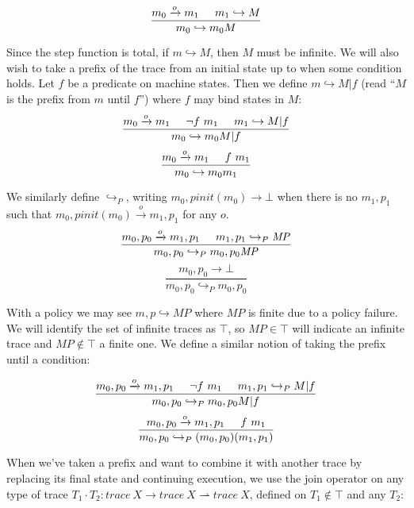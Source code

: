 \documentclass[conference]{IEEEtran}
\newcommand{\MP}{\mathit{MP}}
\begin{document}
    \[\frac{m_0 \xrightarrow{o} m_1 \hspace{.5cm} m_1 \hookrightarrow M}
           {m_0 \hookrightarrow m_0 M}\]

    Since the step function is total, if \(m \hookrightarrow M\), then \(M\) must be infinite.
    We will also wish to take a prefix of the trace from an initial state up to when some condition
    holds. Let \(f\) be a predicate on machine states. Then we define \(m \hookrightarrow M | f\)
    (read ``\(M\) is the prefix from \(m\) until \(f\)'') where \(f\) may bind states in \(M\):
    \[\frac{m_0 \xrightarrow{o} m_1 \hspace{.5cm} \neg f\ m_1 \hspace{.5cm} m_1 \hookrightarrow M | f }
           {m_0 \hookrightarrow m_0 M | f}\]
    \[\frac{m_0 \xrightarrow{o} m_1 \hspace{.5cm} f\ m_1}
           {m_0 \hookrightarrow m_0 m_1}\]

    We similarly define \(\hookrightarrow_P\), writing \(m_0,\mathit{pinit}(m_0) \longrightarrow \bot\) when
    there is no \(m_1,p_1\) such that \(m_0,\mathit{pinit}(m_0) \xrightarrow{o} m_1,p_1\) for any \(o\).
    \[\frac{m_0,p_0 \xrightarrow{o} m_1,p_1 \hspace{.5cm} m_1,p_1 \hookrightarrow_P \MP}
           {m_0,p_0 \hookrightarrow_P m_0,p_0 \MP}\]
    \[\frac{m_0,p_0 \longrightarrow \bot}
           {m_0,p_0 \hookrightarrow_P m_0,p_0}\]

    With a policy we may see \(m,p \hookrightarrow \MP\) where \(\MP\) is finite due to a policy
    failure. We will identify the set of infinite traces as \(\top\), so \(\MP \in \top\) will
    indicate an infinite trace and \(\MP \not \in \top\) a finite one.
    We define a similar notion of taking the prefix until a condition:

    \[\frac{m_0,p_0 \xrightarrow{o} m_1,p_1 \hspace{.5cm} \neg f\ m_1 \hspace{.5cm} m_1,p_1
              \hookrightarrow_P M | f }
           {m_0,p_0 \hookrightarrow_P m_0,p_0 M | f}\]
    \[\frac{m_0,p_0 \xrightarrow{o} m_1,p_1 \hspace{.5cm} f\ m_1}
           {m_0,p_0 \hookrightarrow_P (m_0,p_0) (m_1,p_1)}\]

    When we've taken a prefix and want to combine it with another trace by replacing its final
    state and continuing execution, we use the join operator on any type of trace \(T_1 \cdot T_2 :
    \mathit{trace}\ X \rightarrow \mathit{trace}\ X \rightharpoonup \mathit{trace}\ X\), defined
    on \(T_1 \not \in \top\) and any \(T_2\):
\end{document}
